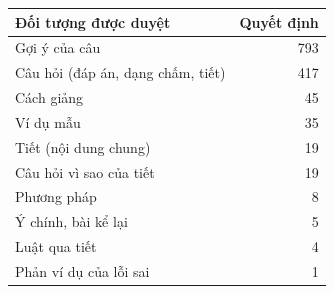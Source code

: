 \small
\begin{tabular}{@{}lr@{}}
\toprule
Đối tượng được duyệt & Quyết định \\
\midrule
Gợi ý của câu & 793 \\
Câu hỏi (đáp án, dạng chấm, tiết) & 417 \\
Cách giảng & 45 \\
Ví dụ mẫu & 35 \\
Tiết (nội dung chung) & 19 \\
Câu hỏi vì sao của tiết & 19 \\
Phương pháp & 8 \\
Ý chính, bài kể lại & 5 \\
Luật qua tiết & 4 \\
Phản ví dụ của lỗi sai & 1 \\
\bottomrule
\end{tabular}
